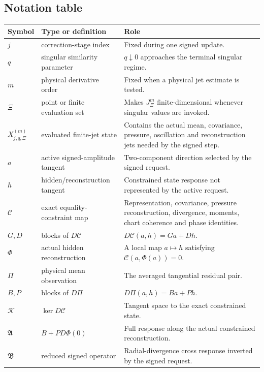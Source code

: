\documentclass[12pt]{article}
\renewcommand{\arraystretch}{1.10}
\theoremstyle{plain}
\theoremstyle{definition}
\theoremstyle{remark}
\newcommand{\Comp}{\mathfrak A}
\newcommand{\Red}{\mathfrak B}
\newcommand{\Constr}{\mathcal C}
\newcommand{\Obs}{\Pi}
\newcommand{\Ktan}{\mathcal K}
\begin{document}
\subsection{Notation table}
\renewcommand{\arraystretch}{1.15}
\begin{longtable}{>{\raggedright\arraybackslash}p{}>{\raggedright\arraybackslash}p{}>{\raggedright\arraybackslash}p{}}
\toprule
Symbol & Type or definition & Role \\
\midrule
\endhead
\(j\) & correction-stage index & Fixed during one signed update. \\
\(q\) & singular similarity parameter & \(q\downarrow0\) approaches the terminal singular regime. \\
\(m\) & physical derivative order & Fixed when a physical jet estimate is tested. \\
\(\Xi\) & point or finite evaluation set & Makes \(J^m_{\Xi}\) finite-dimensional whenever singular values are invoked. \\
\(X_{j,q,\Xi}^{(m)}\) & evaluated finite-jet state & Contains the actual mean, covariance, pressure, oscillation and reconstruction jets needed by the signed step. \\
\(a\) & active signed-amplitude tangent & Two-component direction selected by the signed request. \\
\(h\) & hidden/reconstruction tangent & Constrained state response not represented by the active request. \\
\(\Constr\) & exact equality-constraint map & Representation, covariance, pressure reconstruction, divergence, moments, chart coherence and phase identities. \\
\(G,D\) & blocks of \(D\Constr\) & \(D\Constr(a,h)=Ga+Dh\). \\
\(\Phi\) & actual hidden reconstruction & A local map \(a\mapsto h\) satisfying \(\Constr(a,\Phi(a))=0\). \\
\(\Obs\) & physical mean observation & The averaged tangential residual pair. \\
\(B,P\) & blocks of \(D\Obs\) & \(D\Obs(a,h)=Ba+Ph\). \\
\(\Ktan\) & \(\ker D\Constr\) & Tangent space to the exact constrained state. \\
\(\Comp\) & \(B+P D\Phi(0)\) & Full response along the actual constrained reconstruction. \\
\(\Red\) & reduced signed operator & Radial-divergence cross response inverted by the signed request. \\

\end{longtable}
\end{document}
